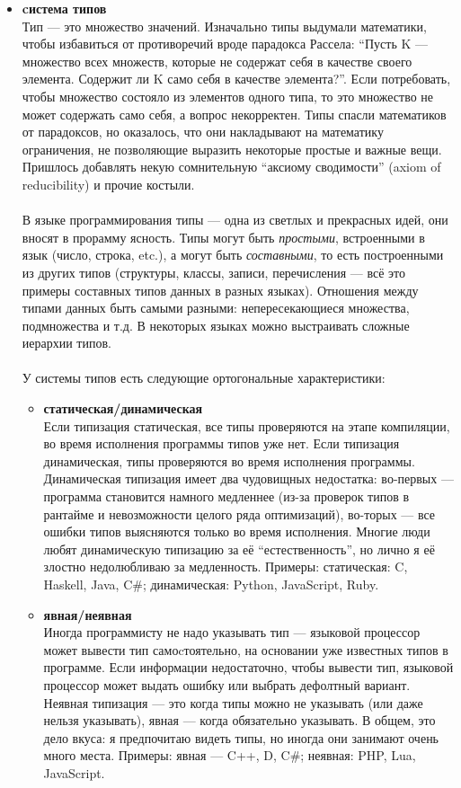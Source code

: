 \documentclass[11pt]{book}
\begin{document}
\begin{itemize}
\item \textbf{cистема типов}
    \\
    Тип --- это множество значений.
    Изначально типы выдумали математики, чтобы избавиться от противоречий вроде парадокса Рассела:
    ``Пусть K — множество всех множеств, которые не содержат себя в качестве своего элемента. Содержит ли K само себя в качестве элемента?''.
    Если потребовать, чтобы множество состояло из элементов одного типа, то это множество не может содержать само себя,
    а вопрос некорректен.
    Типы спасли математиков от парадоксов, но оказалось, что они накладывают на математику ограничения,
    не позволяющие выразить некоторые простые и важные вещи.
    Пришлось добавлять некую сомнительную ``аксиому сводимости'' (axiom of reducibility) и прочие костыли.
    \\ \\
    В языке программирования типы --- одна из светлых и прекрасных идей, они вносят в прорамму ясность.
    Типы могут быть \emph{простыми}, встроенными в язык (число, строка, etc.),
    а могут быть \emph{составными}, то есть построенными из других типов (структуры, классы, записи, перечисления ---
    всё это примеры составных типов данных в разных языках).
    Отношения между типами данных быть самыми разными: непересекающиеся множества, подмножества и т.д.
    В некоторых языках можно выстраивать сложные иерархии типов.
    \\ \\
    У системы типов есть следующие ортогональные характеристики:
    \begin{itemize}
    \item \textbf{статическая/динамическая}
        \\
        Если типизация статическая, все типы проверяются на этапе компиляции, во время исполнения программы типов уже нет.
        Если типизация динамическая, типы проверяются во время исполнения программы.
        Динамическая типизация имеет два чудовищных недостатка: во-первых --- программа становится намного медленнее
        (из-за проверок типов в рантайме и невозможности целого ряда оптимизаций),
        во-торых --- все ошибки типов выясняются только во время исполнения.
        Многие люди любят динамическую типизацию за её ``естественность'', но лично я её злостно недолюбливаю за медленность.
        Примеры: статическая: C, Haskell, Java, C\#; динамическая: Python, JavaScript, Ruby.

    \item \textbf{явная/неявная}
        \\
        Иногда программисту не надо указывать тип --- языковой процессор может вывести тип самоcтоятельно, на основании уже известных типов в программе.
        Если информации недостаточно, чтобы вывести тип, языковой процессор может выдать ошибку или выбрать дефолтный вариант.
        Неявная типизация --- это когда типы можно не указывать (или даже нельзя указывать), явная --- когда обязательно указывать.
        В общем, это дело вкуса: я предпочитаю видеть типы, но иногда они занимают очень много места.
        Примеры: явная --- C++, D, C\#; неявная: PHP, Lua, JavaScript.


\end{itemize}
\end{itemize}
\end{document}
